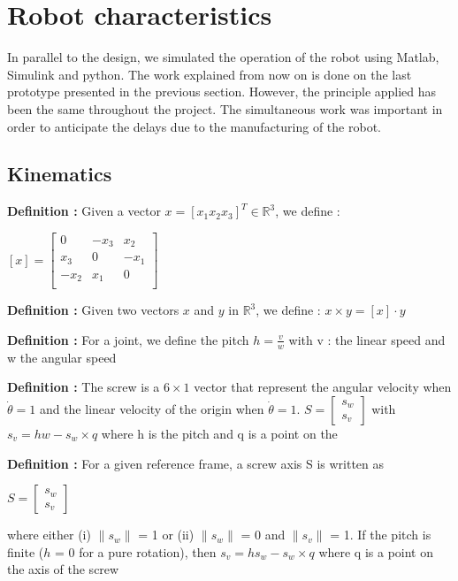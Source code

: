 \section{Robot characteristics}\insertloftspace
\setcounter{figure}{0}\setcounter{table}{0}

\hspace{\parindent} In parallel to the design, we simulated the operation of the robot using Matlab, Simulink and python. The work explained from now on is done on the last prototype presented in the previous section. However, the principle applied has been the same throughout the project. The simultaneous work was important in order to anticipate the delays due to the manufacturing of the robot. 

\subsection{Kinematics}

\textbf{Definition :} Given a vector $x=[x_1 x_2 x_3]^T \in \mathbb{R}^3$, we define : 
\begin{center}
    $[x] = \begin{bmatrix}
        0 & -x_3 & x_2 \\
        x_3 & 0 & -x_1 \\
        -x_2 & x_1 & 0 \\
    \end{bmatrix}$
\end{center}

\noindent\textbf{Definition :} Given two vectors $x$ and $y$ in $\mathbb{R}^3$, we define : $x\times y = [x]\cdot y$

\bigbreak
\noindent\textbf{Definition :} For a joint, we define the pitch $h = \frac{v}{w}$ with v : the linear speed and w the angular speed

\bigbreak
\noindent\textbf{Definition :} The screw is a $6\times1$ vector that represent the angular velocity when $\dot{\theta}=1$ and the linear velocity of the origin when $\dot{\theta}=1$. $S = \begin{bmatrix} s_w\\s_v\end{bmatrix}$ with $s_v = hw-s_w\times q$ where h is the pitch and q is a point on the 

\noindent\textbf{Definition :} For a given reference frame, a screw axis S is written as 
\begin{center}
    $S=\begin{bmatrix}
        s_w\\s_v
    \end{bmatrix}$
\end{center}
where either (i) $\|s_w\|$ = 1 or (ii) $\|s_w\|$ = 0 and $\|s_v\|$ = 1. If the pitch is finite ($h$ = 0 for a pure rotation), then $s_v = hs_w-s_w\times q$ where q is a point on the axis of the screw

